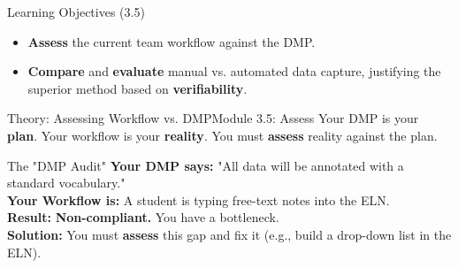 \begin{frame}{Learning Objectives (3.5)}
    \begin{itemize}
        \item \textbf{Assess} the current team workflow against the DMP.
        \item \textbf{Compare} and \textbf{evaluate} manual vs. automated data capture, justifying the superior method based on \textbf{verifiability}.
    \end{itemize}
\end{frame}

\begin{frame}{Theory: Assessing Workflow vs. DMP}{Module 3.5: Assess}
    Your DMP is your \textbf{plan}. Your workflow is your \textbf{reality}. You must \textbf{assess} reality against the plan. \\
    \pause
    \begin{block}{The "DMP Audit"}
        \textbf{Your DMP says:} "All data will be annotated with a standard vocabulary." \\
        \pause
        \textbf{Your Workflow is:} A student is typing free-text notes into the ELN. \\
        \pause
        \textbf{Result:} \textbf{Non-compliant.} You have a bottleneck. \\
        \pause
        \textbf{Solution:} You must \textbf{assess} this gap and fix it (e.g., build a drop-down list in the ELN). \\
    \end{block}
\end{frame}


